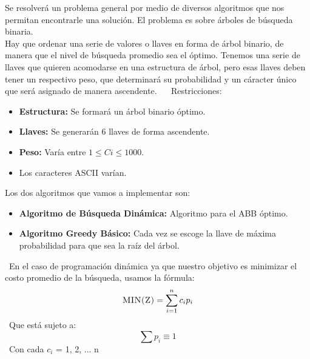 \documentclass[10pt,letterpaper]{article}
\begin{document}
 \newline \newline 
        Se resolverá un problema general por medio de diversos algoritmos que nos 
        permitan encontrarle una solución. 
        El problema es sobre árboles de búsqueda binaria. \\ 
        Hay que ordenar una serie de valores o llaves en forma de árbol binario, de manera que 
        el nivel de búsqueda promedio sea el óptimo. 
        Tenemos una serie de llaves que quieren acomodarse en una estructura de árbol, 
        pero esas llaves deben tener un respectivo peso, que determinará su probabilidad 
        y un cáracter único que será asignado de manera ascendente. \ \ \newline \newline 
        Restricciones: 
        \begin{itemize} 
        \item \textbf{Estructura:} Se formará un árbol binario óptimo. 
        \item \textbf{Llaves:} Se generarán 6 llaves de forma ascendente. 
        \item \textbf{Peso:} Varía entre $1 \leq C{i} \leq 1000$. 
        \item Los caracteres ASCII varían. 
        \end{itemize} 
        Los dos algoritmos que vamos a implementar son: 
        \begin{itemize} 
        \item \textbf{Algoritmo de Búsqueda Dinámica:} Algoritmo para el ABB óptimo. 
        \item \textbf{Algoritmo Greedy Básico:} Cada vez se escoge la llave de máxima probabilidad 
         para que sea la raíz del árbol. 
        \end{itemize} 
        \ En el caso de programación dinámica ya que nuestro objetivo es minimizar el costo promedio de la búsqueda, usamos la fórmula: 
        \[ \textsc{\normalsize MIN(Z)}\\[0.5cm] = \sum_{i=1}^{n}c_{i}p_{i} \] 
        \ Que está sujeto a:  
        \[ \sum p_{i} \equiv 1 \] 
        \ Con cada $c_{i}$ = 1, 2, ... n  
        \ \ \newline \newline 
        
\end{document}
